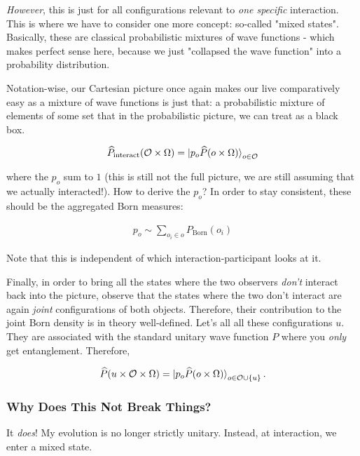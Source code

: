 \documentclass{article}
\begin{document}
\textit{However}, this is just for all configurations relevant to \textit{one specific} interaction. This is where we have to consider one more concept: so-called "mixed states". Basically, these are classical probabilistic mixtures of wave functions - which makes perfect sense here, because we just "collapsed the wave function" into a probability distribution.

Notation-wise, our Cartesian picture once again makes our live comparatively easy as a mixture of wave functions is just that: a probabilistic mixture of elements of some set that in the probabilistic picture, we can treat as a black box.

\begin{align*}
\widehat{P}_{\text{interact}}(\mathcal{O}\times\Omega) = \ket{p_o \widehat{P}(o\times\Omega)}_{o\in\mathcal{O}}
\end{align*}

where the $p_o$ sum to $1$ (this is still not the full picture, we are still assuming that we actually interacted!). How to derive the $p_o$? In order to stay consistent, these should be the aggregated Born measures:

\begin{align*}
p_o \sim \sum_{o_i\in o}P_{\text{Born}}(o_i)
\end{align*}

Note that this is independent of which interaction-participant looks at it.

Finally, in order to bring all the states where the two observers \textit{don't} interact back into the picture, observe that the states where the two don't interact are again \textit{joint} configurations of both objects. Therefore, their contribution to the joint Born density is in theory well-defined. Let's all all these configurations $u$. They are associated with the standard unitary wave function $P$ where you \textit{only} get entanglement. Therefore,

\begin{align*}
\widehat{P}(u\times\mathcal{O}\times\Omega) = \ket{p_o \widehat{P}(o\times\Omega)}_{o\in\mathcal{O}\cup \lbrace u\rbrace}.
\end{align*}

\subsubsection{Why Does This Not Break Things?}

It \textit{does}! My evolution is no longer strictly unitary. Instead, at interaction, we enter a mixed state.
\end{document}
